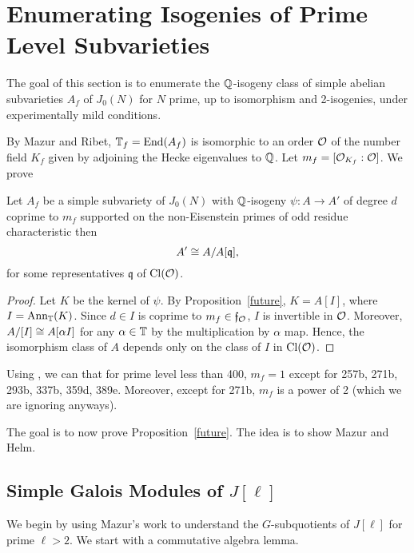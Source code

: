 \documentclass{article}
\begin{document}
    
\section{Enumerating Isogenies of Prime Level Subvarieties}

The goal of this section is to enumerate the $\mathbb{Q}$-isogeny class of simple
abelian subvarieties $A_f$ of $J_0(N)$ for $N$ prime, up to isomorphism and
2-isogenies, under experimentally mild conditions.

By Mazur and Ribet, $\mathbb{T}_f=\operatorname{End}(A_f)$ is isomorphic to an order $\mathcal{O}$ of the
number field $K_f$ given by adjoining the Hecke eigenvalues to $\mathbb{Q}$. Let
$m_f=[\mathcal{O}_{K_f}:\mathcal{O}]$. We prove 

\begin{theorem}
    Let $A_f$ be a simple subvariety of $J_0(N)$ with $\mathbb{Q}$-isogeny $\psi:A\to
    A'$ of degree $d$ coprime to $m_f$ supported on the non-Eisenstein primes
    of odd residue characteristic then
    \[
        A' \cong A/A[\mathfrak{q}],
    \]
    for some representatives $\mathfrak{q}$ of $\operatorname{Cl}(\mathcal{O})$.
\end{theorem}
\begin{proof}
    Let $K$ be the kernel of $\psi$. By Proposition~\ref{future}, $K=A[I]$,
    where $I=\operatorname{Ann}_{\mathbb{T}}(K)$. Since $d\in I$ is coprime to $m_f\in
    \mathfrak{f}_{\mathcal{O}}$, $I$ is invertible in $\mathcal{O}$. Moreover, $A/[I]\cong
    A[\alpha I]$ for any $\alpha\in \mathbb{T}$ by the multiplication by $\alpha$ map.
    Hence, the isomorphism class of $A$ depends only on the class of $I$ in
    $\operatorname{Cl}(\mathcal{O})$.
\end{proof}

\begin{remark}
    Using \sage, we can that for prime level less than 400, $m_f=1$ except for
    257b, 271b, 293b, 337b, 359d, 389e. Moreover, except for 271b, $m_f$ is a
    power of 2 (which we are ignoring anyways).
\end{remark}

The goal is to now prove Proposition~\ref{future}. The idea is to show Mazur
and Helm.

\subsection{Simple Galois Modules of $J[\ell]$}\label{subsection:simple_galois_ell}

We begin by using Mazur's work to understand the $G$-subquotients of $J[\ell]$
for prime $\ell>2$. We start with a commutative algebra lemma.
\end{document}
